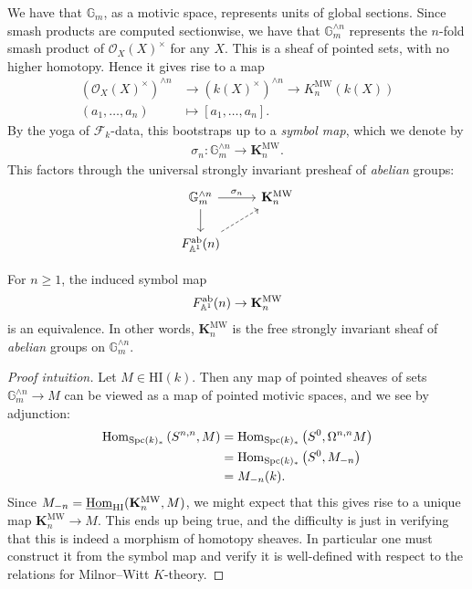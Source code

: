 \documentclass[11pt,openany]{book}
\providecommand{\HI}{\mathrm{HI}}
\providecommand{\MW}{\mathrm{MW}}
\let\smashprod\wedge
\providecommand{\KMW}{\mathbf{K}^\mathrm{MW}}
\begin{document}
We have that $\mathbb{G}_m$, as a motivic space, represents units of global sections. Since smash products are computed sectionwise, we have that $\mathbb{G}_m^{\smashprod n}$ represents the $n$-fold smash product of $\mathcal{O}_X(X)^\times$ for any $X$. This is a sheaf of pointed sets, with no higher homotopy. Hence it gives rise to a map
\begin{align*}
    \left( \mathcal{O}_X(X)^\times \right)^{\smashprod n} &\to (k(X)^\times)^{\smashprod n} \to K_n^\MW(k(X)) \\
    (a_1, \ldots, a_n) &\mapsto \left[ a_1, \ldots, a_n \right].
\end{align*}
By the yoga of $\mathcal{F}_k$-data, this bootstraps up to a \textit{symbol map}, which we denote by
\begin{align*}
    \sigma_n \colon \mathbb{G}_m^{\smashprod n} \to \KMW_n.
\end{align*}
%
This factors through the universal strongly invariant presheaf of \textit{abelian} groups:
\[ \begin{tikzcd}
    \mathbb{G}_m^{\smashprod n}\rar["\sigma_n"]\dar & \KMW_n\\
    F_{\A^1}^\ab(n)\ar[ur,dashed] &
\end{tikzcd} \]

\begin{theorem} \cite[3.37]{Morel} For $n\ge 1$, the induced symbol map
\begin{align*}
    F_{\A^1}^\ab(n) \to \KMW_n
\end{align*}
is an equivalence. In other words, $\KMW_n$ is the free strongly invariant sheaf of \textit{abelian} groups on $\mathbb{G}_m^{\smashprod  n}$.
\end{theorem}
\begin{proof}[Proof intuition] Let $M \in \HI(k)$. Then any map of pointed sheaves of sets $\mathbb{G}_m^{\smashprod n} \to M$ can be viewed as a map of pointed motivic spaces, and we see by adjunction:
\begin{align*}
    \mathrm{Hom}_{\mathrm{Spc}(k)_\ast} \left( S^{n,n}, M \right) &= \mathrm{Hom}_{\mathrm{Spc}(k)_\ast} \left( S^0, \Omega^{n,n} M \right) \\
    &= \mathrm{Hom}_{\mathrm{Spc}(k)_\ast} \left( S^0, M_{-n} \right) \\
    &= M_{-n}(k).
\end{align*}
Since $M_{-n} = \underline{\Hom}_{\HI}(\KMW_n, M)$, we might expect that this gives rise to a unique map $\KMW_n \to M$. This ends up being true, and the difficulty is just in verifying that this is indeed a morphism of homotopy sheaves. In particular one must construct it from the symbol map and verify it is well-defined with respect to the relations for Milnor--Witt $K$-theory.
\end{proof}
\end{document}

